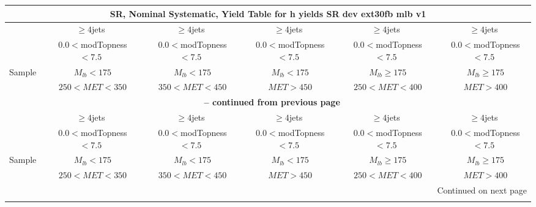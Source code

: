 \documentclass{article}
\begin{document}
\begin{longtable}{|l|c|c|c|c|c|} 
 
\multicolumn{6}{c}{ SR, Nominal Systematic, Yield Table for h yields SR dev ext30fb mlb v1 }\\* \hline 
  & $\ge4$jets  & $\ge4$jets  & $\ge4$jets  & $\ge4$jets  & $\ge4$jets \\* 
  & ~$0.0<$modTopness$<7.5$  & ~$0.0<$modTopness$<7.5$  & ~$0.0<$modTopness$<7.5$  & ~$0.0<$modTopness$<7.5$  & ~$0.0<$modTopness$<7.5$ \\* 
Sample  & ~$M_{lb}<175$  & ~$M_{lb}<175$  & ~$M_{lb}<175$  & ~$M_{lb}\ge175$  & ~$M_{lb}\ge175$ \\* 
  & ~$250<MET<350$  & ~$350<MET<450$  & ~$MET>450$  & ~$250<MET<400$  & ~$MET>400$ \\* 
\hline \hline 
\endfirsthead 
 
\multicolumn{6}{c}{{\bfseries \tablename\ \thetable{} -- continued from previous page}}\\* \hline 
  & $\ge4$jets  & $\ge4$jets  & $\ge4$jets  & $\ge4$jets  & $\ge4$jets \\* 
  & ~$0.0<$modTopness$<7.5$  & ~$0.0<$modTopness$<7.5$  & ~$0.0<$modTopness$<7.5$  & ~$0.0<$modTopness$<7.5$  & ~$0.0<$modTopness$<7.5$ \\* 
Sample  & ~$M_{lb}<175$  & ~$M_{lb}<175$  & ~$M_{lb}<175$  & ~$M_{lb}\ge175$  & ~$M_{lb}\ge175$ \\* 
  & ~$250<MET<350$  & ~$350<MET<450$  & ~$MET>450$  & ~$250<MET<400$  & ~$MET>400$ \\* 
\hline \hline 
\endhead 
 
\multicolumn{6}{|r|}{{Continued on next page}}\\* \hline 
\endfoot 
 
 
\endlastfoot 
 

\end{longtable}
\end{document}
